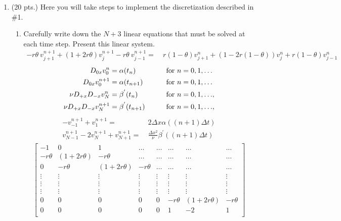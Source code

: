\documentclass[11pt]{article}
\newcommand{\Dpx}{D_{+x}}
\newcommand{\Dmx}{D_{-x}}
\newcommand{\Dzx}{D_{0x}}
\newcommand{\dx}{\Delta x}
\newcommand{\dt}{\Delta t}
\newcommand{\vnj}{v^{n}_j}
\newcommand{\vnpj}{v^{n+1}_j}
\newcommand{\vnjp}{v^{n}_{j+1}}
\newcommand{\vnjm}{v^{n}_{j-1}}
\newcommand{\vnpjp}{v^{n+1}_{j+1}}
\newcommand{\vnpjm}{v^{n+1}_{j-1}}
\newcommand{\bra}[1]{\left(#1\right)}
\begin{document}
\begin{enumerate}
  \item  (20 pts.){\color{red} Here you will take steps to implement the discretization described in \#1.}
    \begin{enumerate}
      \item {\color{blue}Carefully write down the} $N+3$ {\color{blue}linear equations that must be solved at each time step. Present this linear system.}
        \begin{align*}
      -r\theta \ \vnpjp + \left(1+2r\theta\right)\vnpj - r\theta \ \vnpjm = & \ r\left(1-\theta \right)\vnjp + \left(1-2r\left(1-\theta \right)\right)\vnj + r\left(1-\theta\right)\vnjm
      \end{align*}
      \begin{align*}
       \Dzx v_0^n & = \alpha(t_n) && \qquad \hbox{for $n=0,1,\ldots$}\\
       \Dzx v_0^{n+1} & = \alpha(t_{n+1}) && \qquad \hbox{for $n=0,1,\ldots$}\\
      \nu\Dpx\Dmx v_N^n & = \beta^{'}(t_n) && \qquad \hbox{for $n=0,1,\ldots$},\\
      \nu\Dpx\Dmx v_N^{n+1} & = \beta^{'}(t_{n+1}) && \qquad \hbox{for $n=0,1,\ldots$},
      \end{align*}
      \begin{align*}
      - v^{n+1}_{-1} + v^{n+1}_{1} =& \ 2\dx \alpha(\bra{n+1}\dt) \\
      v^{n+1}_{N-1} -2v^{n+1}_N + v^{n+1}_{N+1} = & \ \frac{\dx^2}{\nu} \beta^{'}(\bra{n+1}\dt)
      \end{align*}
      \begin{align*}
      \begin{bmatrix}
      -1 & 0 &  1& \ldots & \ldots & \ldots &  \ldots & \dots\\
      -r\theta & \bra{1+2r\theta} & -r\theta & \ldots & \ldots & \ldots & \ldots & \dots\\
      0 & -r\theta & \bra{1+2r\theta} & -r\theta & \ldots & \ldots &  \ldots & \dots \\
      \vdots & \vdots & \vdots & \vdots & \vdots & \vdots & \vdots & \vdots \\
      \vdots & \vdots & \vdots & \vdots & \vdots & \vdots  & \vdots & \vdots\\
      \vdots & \vdots & \vdots & \vdots & \vdots & \vdots & \vdots & \vdots \\
      0 & 0 & 0 & 0 & 0 & -r\theta & \bra{1+2r\theta} & -r\theta \\
      0 & 0 & 0 & 0 & 0 & 1 & -2 & 1 \\

\end{bmatrix}
\end{align*}
\end{enumerate}
\end{enumerate}
\end{document}
